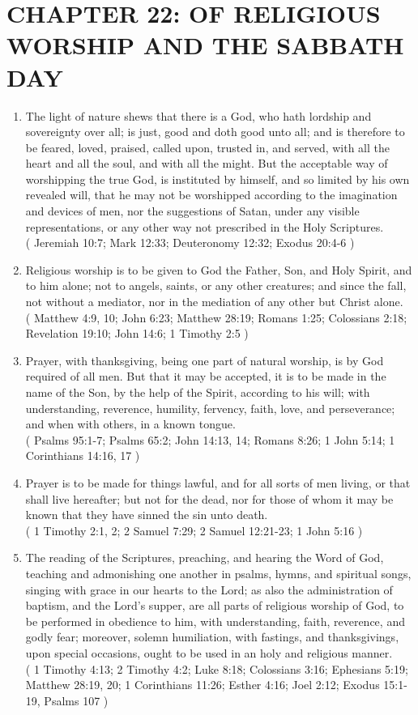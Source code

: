 \documentclass[12pt,a4paper]{book}
\begin{document}
\chapter{CHAPTER 22: OF RELIGIOUS WORSHIP AND THE SABBATH DAY}
\label{ch-rel-wor}
\begin{enumerate}
\item The light of nature shews that there is a God, who hath lordship and sovereignty over all; is just, good and doth good unto all; and is therefore to be feared, loved, praised, called upon, trusted in, and served, with all the heart and all the soul, and with all the might. But the acceptable way of worshipping the true God, is instituted by himself, and so limited by his own revealed will, that he may not be worshipped according to the imagination and devices of men, nor the suggestions of Satan, under any visible representations, or any other way not prescribed in the Holy Scriptures.\\
( Jeremiah 10:7; Mark 12:33; Deuteronomy 12:32; Exodus 20:4-6 )
\item Religious worship is to be given to God the Father, Son, and Holy Spirit, and to him alone; not to angels, saints, or any other creatures; and since the fall, not without a mediator, nor in the mediation of any other but Christ alone.\\
( Matthew 4:9, 10; John 6:23; Matthew 28:19; Romans 1:25; Colossians 2:18; Revelation 19:10; John 14:6; 1 Timothy 2:5 )
\item Prayer, with thanksgiving, being one part of natural worship, is by God required of all men. But that it may be accepted, it is to be made in the name of the Son, by the help of the Spirit, according to his will; with understanding, reverence, humility, fervency, faith, love, and perseverance; and when with others, in a known tongue.\\
( Psalms 95:1-7; Psalms 65:2; John 14:13, 14; Romans 8:26; 1 John 5:14; 1 Corinthians 14:16, 17 )
\item Prayer is to be made for things lawful, and for all sorts of men living, or that shall live hereafter; but not for the dead, nor for those of whom it may be known that they have sinned the sin unto death.\\
( 1 Timothy 2:1, 2; 2 Samuel 7:29; 2 Samuel 12:21-23; 1 John 5:16 )
\item The reading of the Scriptures, preaching, and hearing the Word of God, teaching and admonishing one another in psalms, hymns, and spiritual songs, singing with grace in our hearts to the Lord; as also the administration of baptism, and the Lord's supper, are all parts of religious worship of God, to be performed in obedience to him, with understanding, faith, reverence, and godly fear; moreover, solemn humiliation, with fastings, and thanksgivings, upon special occasions, ought to be used in an holy and religious manner.\\
( 1 Timothy 4:13; 2 Timothy 4:2; Luke 8:18; Colossians 3:16; Ephesians 5:19; Matthew 28:19, 20; 1 Corinthians 11:26; Esther 4:16; Joel 2:12; Exodus 15:1-19, Psalms 107 )


\end{enumerate}
\end{document}
